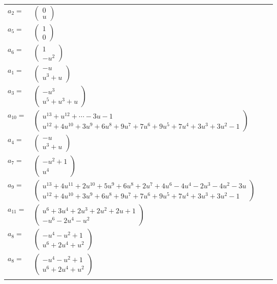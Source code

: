 \documentclass[1p]{elsarticle_modified}
\theoremstyle{definition}
\begin{document}
\begin{tabular}{m{7pt} m{180pt} m{7pt} m{180pt} }
\flushright $a_{2}=$&$\begin{pmatrix}0\\u\end{pmatrix}$ \\
\flushright $a_{5}=$&$\begin{pmatrix}1\\0\end{pmatrix}$ \\
\flushright $a_{6}=$&$\begin{pmatrix}1\\- u^2\end{pmatrix}$ \\
\flushright $a_{1}=$&$\begin{pmatrix}- u\\u^3+u\end{pmatrix}$ \\
\flushright $a_{3}=$&$\begin{pmatrix}- u^3\\u^5+u^3+u\end{pmatrix}$ \\
\flushright $a_{10}=$&$\begin{pmatrix}u^{13}+u^{12}+\cdots-3 u-1\\u^{12}+4 u^{10}+3 u^9+6 u^8+9 u^7+7 u^6+9 u^5+7 u^4+3 u^3+3 u^2-1\end{pmatrix}$ \\
\flushright $a_{4}=$&$\begin{pmatrix}- u\\u^3+u\end{pmatrix}$ \\
\flushright $a_{7}=$&$\begin{pmatrix}- u^2+1\\u^4\end{pmatrix}$ \\
\flushright $a_{9}=$&$\begin{pmatrix}u^{13}+4 u^{11}+2 u^{10}+5 u^9+6 u^8+2 u^7+4 u^6-4 u^4-2 u^3-4 u^2-3 u\\u^{12}+4 u^{10}+3 u^9+6 u^8+9 u^7+7 u^6+9 u^5+7 u^4+3 u^3+3 u^2-1\end{pmatrix}$ \\
\flushright $a_{11}=$&$\begin{pmatrix}u^6+3 u^4+2 u^3+2 u^2+2 u+1\\- u^6-2 u^4- u^2\end{pmatrix}$ \\
\flushright $a_{8}=$&$\begin{pmatrix}- u^4- u^2+1\\u^6+2 u^4+u^2\end{pmatrix}$\\ \flushright $a_{8}=$&$\begin{pmatrix}- u^4- u^2+1\\u^6+2 u^4+u^2\end{pmatrix}$\\&\end{tabular}
\end{document}
